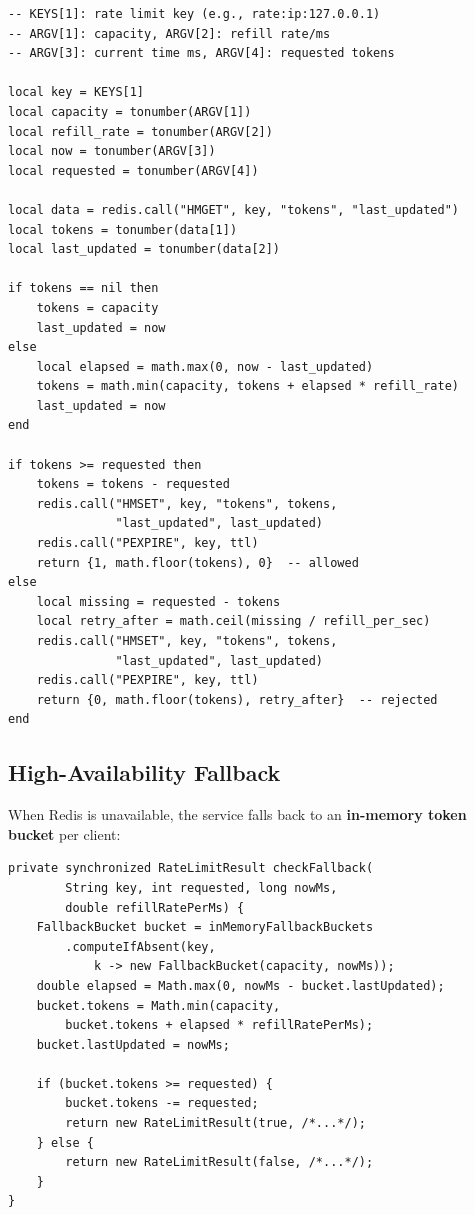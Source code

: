 \documentclass[12pt,a4paper]{report}
\begin{document}
\begin{lstlisting}[style=LuaStyle, caption={rate\_limiter.lua -- Atomic Token Bucket Script}]
-- KEYS[1]: rate limit key (e.g., rate:ip:127.0.0.1)
-- ARGV[1]: capacity, ARGV[2]: refill rate/ms
-- ARGV[3]: current time ms, ARGV[4]: requested tokens

local key = KEYS[1]
local capacity = tonumber(ARGV[1])
local refill_rate = tonumber(ARGV[2])
local now = tonumber(ARGV[3])
local requested = tonumber(ARGV[4])

local data = redis.call("HMGET", key, "tokens", "last_updated")
local tokens = tonumber(data[1])
local last_updated = tonumber(data[2])

if tokens == nil then
    tokens = capacity
    last_updated = now
else
    local elapsed = math.max(0, now - last_updated)
    tokens = math.min(capacity, tokens + elapsed * refill_rate)
    last_updated = now
end

if tokens >= requested then
    tokens = tokens - requested
    redis.call("HMSET", key, "tokens", tokens,
               "last_updated", last_updated)
    redis.call("PEXPIRE", key, ttl)
    return {1, math.floor(tokens), 0}  -- allowed
else
    local missing = requested - tokens
    local retry_after = math.ceil(missing / refill_per_sec)
    redis.call("HMSET", key, "tokens", tokens,
               "last_updated", last_updated)
    redis.call("PEXPIRE", key, ttl)
    return {0, math.floor(tokens), retry_after}  -- rejected
end
\end{lstlisting}

\subsection{High-Availability Fallback}
When Redis is unavailable, the service falls back to an \textbf{in-memory token bucket} per client:

\begin{lstlisting}[style=JavaStyle, caption={RateLimiterService.java -- In-Memory Fallback}]
private synchronized RateLimitResult checkFallback(
        String key, int requested, long nowMs,
        double refillRatePerMs) {
    FallbackBucket bucket = inMemoryFallbackBuckets
        .computeIfAbsent(key,
            k -> new FallbackBucket(capacity, nowMs));
    double elapsed = Math.max(0, nowMs - bucket.lastUpdated);
    bucket.tokens = Math.min(capacity,
        bucket.tokens + elapsed * refillRatePerMs);
    bucket.lastUpdated = nowMs;

    if (bucket.tokens >= requested) {
        bucket.tokens -= requested;
        return new RateLimitResult(true, /*...*/);
    } else {
        return new RateLimitResult(false, /*...*/);
    }
}
\end{lstlisting}
\end{document}
